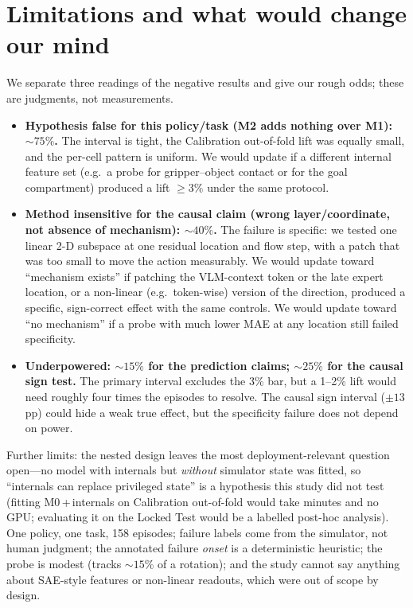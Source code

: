 \documentclass[11pt,a4paper]{article}
\newcommand{\Mz}{M0}\newcommand{\Mo}{M1}\newcommand{\Mt}{M2}
\begin{document}
\section{Limitations and what would change our mind}
\label{sec:limits}
We separate three readings of the negative results and give our rough odds; these are judgments, not measurements.
\begin{itemize}
\item \textbf{Hypothesis false for this policy/task (\Mt{} adds nothing over \Mo{}): $\sim 75\%$.} The interval is tight, the Calibration out-of-fold lift was equally small, and the per-cell pattern is uniform. We would update if a different internal feature set (e.g.\ a probe for gripper--object contact or for the goal compartment) produced a lift $\geq 3\%$ under the same protocol.
\item \textbf{Method insensitive for the causal claim (wrong layer/coordinate, not absence of mechanism): $\sim 40\%$.} The failure is specific: we tested one linear 2-D subspace at one residual location and flow step, with a patch that was too small to move the action measurably. We would update toward ``mechanism exists'' if patching the VLM-context token or the late expert location, or a non-linear (e.g.\ token-wise) version of the direction, produced a specific, sign-correct effect with the same controls. We would update toward ``no mechanism'' if a probe with much lower MAE at any location still failed specificity.
\item \textbf{Underpowered: $\sim 15\%$ for the prediction claims; $\sim 25\%$ for the causal sign test.} The primary interval excludes the 3\% bar, but a 1--2\% lift would need roughly four times the episodes to resolve. The causal sign interval ($\pm 13$\,pp) could hide a weak true effect, but the specificity failure does not depend on power.
\end{itemize}
Further limits: the nested design leaves the most deployment-relevant question open---no model with internals but \emph{without} simulator state was fitted, so ``internals can replace privileged state'' is a hypothesis this study did not test (fitting \Mz{}\,+\,internals on Calibration out-of-fold would take minutes and no GPU; evaluating it on the Locked Test would be a labelled post-hoc analysis). One policy, one task, 158 episodes; failure labels come from the simulator, not human judgment; the annotated failure \emph{onset} is a deterministic heuristic; the probe is modest (tracks $\sim 15\%$ of a rotation); and the study cannot say anything about SAE-style features or non-linear readouts, which were out of scope by design.
\end{document}

